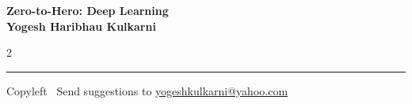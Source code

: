 \documentclass[8pt,landscape]{article}
\begin{document}
\footnotesize


\begin{center}
\Large{\textbf{Zero-to-Hero: Deep Learning\\ Yogesh Haribhau Kulkarni}}  
\end{center}

\begin{multicols}{2}

\end{multicols}

\rule{\linewidth}{0.25pt}
\scriptsize
Copyleft \textcopyleft\  Send suggestions to 
\href{http://www.yogeshkulkarni.com}{yogeshkulkarni@yahoo.com}
\end{document}
